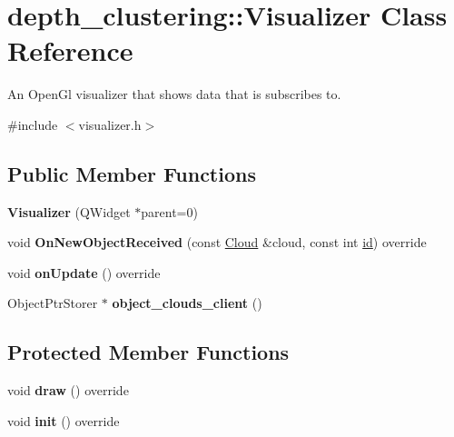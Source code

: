 \hypertarget{classdepth__clustering_1_1Visualizer}{}\section{depth\+\_\+clustering\+:\+:Visualizer Class Reference}
\label{classdepth__clustering_1_1Visualizer}


An Open\+Gl visualizer that shows data that is subscribes to.  




{\ttfamily \#include $<$visualizer.\+h$>$}

\subsection*{Public Member Functions}
\begin{DoxyCompactItemize}
\item 
\mbox{\label{classdepth__clustering_1_1Visualizer_aa7c3d468a72527994fc8eac0389c9369}} 
{\bfseries Visualizer} (Q\+Widget $\ast$parent=0)
\item 
\mbox{\label{classdepth__clustering_1_1Visualizer_a5aeab607107e2b42e40d96e05d3ed36e}} 
void {\bfseries On\+New\+Object\+Received} (const \hyperlink{classdepth__clustering_1_1Cloud}{Cloud} \&cloud, const int \hyperlink{classdepth__clustering_1_1Identifiable_a50f8b49ce7f7f0d9d02f31f74e0fc9e0}{id}) override
\item 
\mbox{\label{classdepth__clustering_1_1Visualizer_a06efdb4138b9c8537c60fc01cc30dd05}} 
void {\bfseries on\+Update} () override
\item 
\mbox{\label{classdepth__clustering_1_1Visualizer_add585ccad73669030843a3f66931431b}} 
Object\+Ptr\+Storer $\ast$ {\bfseries object\+\_\+clouds\+\_\+client} ()
\end{DoxyCompactItemize}
\subsection*{Protected Member Functions}
\begin{DoxyCompactItemize}
\item 
\mbox{\label{classdepth__clustering_1_1Visualizer_aff24496097689cf5ff68e16ea19089c0}} 
void {\bfseries draw} () override
\item 
\mbox{\label{classdepth__clustering_1_1Visualizer_a245dd1bc0064389a470a1fc83208bd1a}} 
void {\bfseries init} () override
\end{DoxyCompactItemize}
